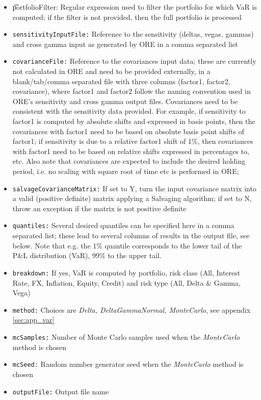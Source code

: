 \documentclass[12pt, a4paper]{article}
\begin{document}
{\begin{itemize}
\item {\t portfolioFilter:} Regular expression used to filter the portfolio for which VaR is computed; if the filter is not provided, then the full portfolio is processed
\item {\tt sensitivityInputFile:} Reference to the sensitivity (deltas, vegas, gammas) and cross gamma input as generated by ORE in a comma separated list
\item {\tt covarianceFile:} Reference to the covariances input data; these are currently not calculated in ORE and need to be provided externally, in a blank/tab/comma separated file with three columns (factor1, factor2, covariance), where factor1 and factor2 follow the naming convention used in ORE's sensitivity and cross gamma output files. Covariances need to be consistent with the sensitivity data provided. For example, if sensitivity to factor1 is computed by absolute shifts and expressed in basis points, then the covariances with factor1 need to be based on absolute basis point shifts of factor1; if sensitivity is due to a relative factor1 shift of 1\%, then covariances with factor1 need to be based on relative shifts expressed in percentages to, etc. Also note that covariances are expected to include the desired holding period, i.e. no scaling with square root of time etc is performed in ORE; 
\item {\tt salvageCovarianceMatrix:} If set to Y, turn the input covariance matrix into a valid (positive definite) matrix applying a Salvaging algorithm; if set to N, throw an exception if the matrix is not positive definite
\item {\tt quantiles:} Several desired quantiles can be specified here in a comma separated list; these lead to several columns of results in the output file, see below. Note that e.g. the 1\% quantile corresponds to the lower tail of the P\&L distribution (VaR), 99\% to the upper tail.
\item {\tt breakdown:} If yes, VaR is computed by portfolio, risk class (All, Interest Rate, FX, Inflation, Equity, Credit) and risk type (All, Delta \& Gamma, Vega)
\item {\tt method:} Choices are {\em Delta, DeltaGammaNormal, MonteCarlo}, see appendix \ref{sec:app_var}
\item {\tt mcSamples:} Number of Monte Carlo samples used when the {\em MonteCarlo} method is chosen 
\item {\tt mcSeed:} Random number generator seed when the {\em MonteCarlo} method is chosen
\item {\tt outputFile:} Output file name
\end{itemize}

}
\end{document}
